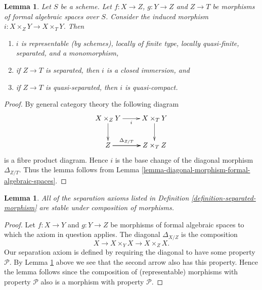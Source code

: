\documentclass{stacks-project}
\theoremstyle{plain}
\newtheorem{lemma}[subsection]{Lemma}
\theoremstyle{definition}
\theoremstyle{remark}
\numberwithin{equation}{subsection}
\begin{document}
\begin{lemma}
\label{lemma-fibre-product-after-map}
Let $S$ be a scheme. Let $f : X \to Z$, $g : Y \to Z$ and $Z \to T$
be morphisms of formal algebraic spaces over $S$. Consider the induced
morphism $i : X \times_Z Y \to X \times_T Y$. Then
\begin{enumerate}
\item $i$ is representable (by schemes), locally of finite type,
locally quasi-finite, separated, and a monomorphism,
\item if $Z \to T$ is separated, then $i$ is a closed immersion, and
\item if $Z \to T$ is quasi-separated, then $i$ is quasi-compact.
\end{enumerate}
\end{lemma}

\begin{proof}
By general category theory the following diagram
$$
\xymatrix{
X \times_Z Y \ar[r]_i \ar[d] & X \times_T Y \ar[d] \\
Z \ar[r]^-{\Delta_{Z/T}} \ar[r] & Z \times_T Z
}
$$
is a fibre product diagram. Hence $i$ is the base change of the
diagonal morphism $\Delta_{Z/T}$. Thus the lemma follows
from Lemma \ref{lemma-diagonal-morphism-formal-algebraic-spaces}.
\end{proof}

\begin{lemma}
\label{lemma-composition-separated}
All of the separation axioms listed in
Definition \ref{definition-separated-morphism}
are stable under composition of morphisms.
\end{lemma}

\begin{proof}
Let $f : X \to Y$ and $g : Y \to Z$ be morphisms of formal algebraic spaces
to which the axiom in question applies.
The diagonal $\Delta_{X/Z}$ is the composition
$$
X \longrightarrow X \times_Y X \longrightarrow X \times_Z X.
$$
Our separation axiom is defined by requiring the diagonal
to have some property $\mathcal{P}$. By
Lemma \ref{lemma-fibre-product-after-map} above we see that
the second arrow also has this property. Hence the lemma follows
since the composition of (representable) morphisms with property
$\mathcal{P}$ also is a morphism with property $\mathcal{P}$.
\end{proof}
\end{document}
